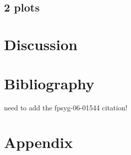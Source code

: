 \documentclass{article}
\begin{document}
\subsection{2 plots}
\label{sec:orgdbc3ee3}

\section{Discussion}
\label{sec:org1e117c4}

\section{Bibliography}
\label{sec:org105e75a}
need to add the fpsyg-06-01544 citation!


\section{Appendix}
\label{sec:org84447a9}
\end{document}
